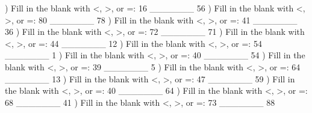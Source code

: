 \documentclass{article}%
\begin{document}
) Fill in the blank with <, >, or =: 16 \_\_\_\_\_\_\_ 56%
\newline%
\newline%
) Fill in the blank with <, >, or =: 80 \_\_\_\_\_\_\_ 78%
\newline%
\newline%
) Fill in the blank with <, >, or =: 41 \_\_\_\_\_\_\_ 36%
\newline%
\newline%
) Fill in the blank with <, >, or =: 72 \_\_\_\_\_\_\_ 71%
\newline%
\newline%
) Fill in the blank with <, >, or =: 44 \_\_\_\_\_\_\_ 12%
\newline%
\newline%
) Fill in the blank with <, >, or =: 54 \_\_\_\_\_\_\_ 1%
\newline%
\newline%
) Fill in the blank with <, >, or =: 40 \_\_\_\_\_\_\_ 54%
\newline%
\newline%
) Fill in the blank with <, >, or =: 39 \_\_\_\_\_\_\_ 5%
\newline%
\newline%
) Fill in the blank with <, >, or =: 64 \_\_\_\_\_\_\_ 13%
\newline%
\newline%
) Fill in the blank with <, >, or =: 47 \_\_\_\_\_\_\_ 59%
\newline%
\newline%
) Fill in the blank with <, >, or =: 40 \_\_\_\_\_\_\_ 64%
\newline%
\newline%
) Fill in the blank with <, >, or =: 68 \_\_\_\_\_\_\_ 41%
\newline%
\newline%
) Fill in the blank with <, >, or =: 73 \_\_\_\_\_\_\_ 88%
\end{document}
